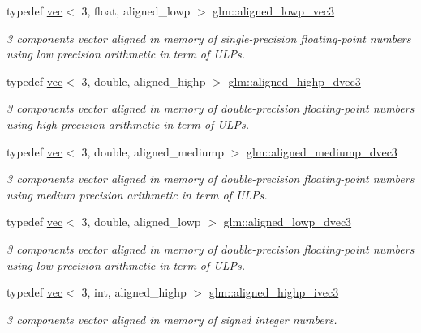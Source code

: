 \begin{DoxyCompactItemize}
typedef \hyperlink{structglm_1_1vec}{vec}$<$ 3, float, aligned\+\_\+lowp $>$ \hyperlink{group__gtc__type__aligned_ga74eb3cf8a9ff6234da5d26f9203e179d}{glm\+::aligned\+\_\+lowp\+\_\+vec3}
\begin{DoxyCompactList}\small\item\em 3 components vector aligned in memory of single-\/precision floating-\/point numbers using low precision arithmetic in term of U\+L\+Ps. \end{DoxyCompactList}\item 
typedef \hyperlink{structglm_1_1vec}{vec}$<$ 3, double, aligned\+\_\+highp $>$ \hyperlink{group__gtc__type__aligned_gafb21f8db25007665c2cb2a9b250471aa}{glm\+::aligned\+\_\+highp\+\_\+dvec3}
\begin{DoxyCompactList}\small\item\em 3 components vector aligned in memory of double-\/precision floating-\/point numbers using high precision arithmetic in term of U\+L\+Ps. \end{DoxyCompactList}\item 
typedef \hyperlink{structglm_1_1vec}{vec}$<$ 3, double, aligned\+\_\+mediump $>$ \hyperlink{group__gtc__type__aligned_gacd6fc80d8b9b4322560c9c27927da5e5}{glm\+::aligned\+\_\+mediump\+\_\+dvec3}
\begin{DoxyCompactList}\small\item\em 3 components vector aligned in memory of double-\/precision floating-\/point numbers using medium precision arithmetic in term of U\+L\+Ps. \end{DoxyCompactList}\item 
typedef \hyperlink{structglm_1_1vec}{vec}$<$ 3, double, aligned\+\_\+lowp $>$ \hyperlink{group__gtc__type__aligned_gab8af6a04a9e5c763725913b11df3cec0}{glm\+::aligned\+\_\+lowp\+\_\+dvec3}
\begin{DoxyCompactList}\small\item\em 3 components vector aligned in memory of double-\/precision floating-\/point numbers using low precision arithmetic in term of U\+L\+Ps. \end{DoxyCompactList}\item 
typedef \hyperlink{structglm_1_1vec}{vec}$<$ 3, int, aligned\+\_\+highp $>$ \hyperlink{group__gtc__type__aligned_gaa469d8bf0cb9ae640c943d847ec48f95}{glm\+::aligned\+\_\+highp\+\_\+ivec3}
\begin{DoxyCompactList}\small\item\em 3 components vector aligned in memory of signed integer numbers. \end{DoxyCompactList}\item 

\end{DoxyCompactItemize}
